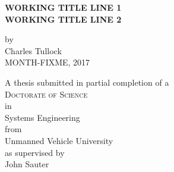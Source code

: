 \begin{titlepage}
	\begin{center}

		\vspace*{1cm}
		 
		\large{ \textbf{ \uppercase{Working Title line 1\\Working title line 2}}}
		
		
		\vspace{1.5cm}
		
		by\\
		Charles Tullock\\
		MONTH-FIXME, 2017
		
		\vspace{3cm}
		
		A thesis submitted in partial completion of a\\
		\large{\textsc{Doctorate of Science}}\\ 
		in\\
		\large{Systems Engineering}\\
		from\\
		\large{Unmanned Vehicle University}\\
		as supervised by\\
		\large{John Sauter}
		\vfill

	\end{center}
\thispagestyle{empty}
\end{titlepage}

